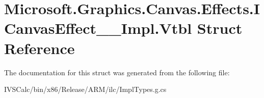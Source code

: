 \hypertarget{struct_microsoft_1_1_graphics_1_1_canvas_1_1_effects_1_1_i_canvas_effect_____impl_1_1_vtbl}{}\section{Microsoft.\+Graphics.\+Canvas.\+Effects.\+I\+Canvas\+Effect\+\_\+\+\_\+\+Impl.\+Vtbl Struct Reference}
\label{struct_microsoft_1_1_graphics_1_1_canvas_1_1_effects_1_1_i_canvas_effect_____impl_1_1_vtbl}


The documentation for this struct was generated from the following file\+:\begin{DoxyCompactItemize}
\item 
I\+V\+S\+Calc/bin/x86/\+Release/\+A\+R\+M/ilc/Impl\+Types.\+g.\+cs\end{DoxyCompactItemize}
